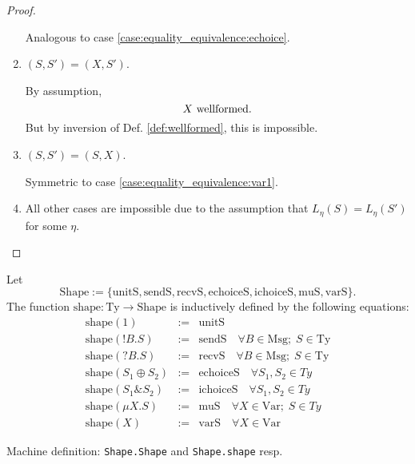 \documentclass{llncs}
\newcommand*{\Msg}{\mathrm{Msg}}
\newcommand*{\Var}{\mathrm{Var}}
\newcommand*{\Ty}{\mathrm{Ty}}
\newcommand*{\Shape}{\mathrm{Shape}}
\newcommand*{\shape}{\mathrm{shape}}
\newcommand*{\unitS}{\mathrm{unitS}}
\newcommand*{\sendS}{\mathrm{sendS}}
\newcommand*{\recvS}{\mathrm{recvS}}
\newcommand*{\echoiceS}{\mathrm{echoiceS}}
\newcommand*{\ichoiceS}{\mathrm{ichoiceS}}
\newcommand*{\muS}{\mathrm{muS}}
\newcommand*{\varS}{\mathrm{varS}}
\newcommand*{\send}{\mathord{!}}
\newcommand*{\recv}{\mathord{?}}
\newcommand*{\echoice}{\oplus}
\newcommand*{\ichoice}{\mathop{\&}}
\newcommand*{\wf}[1]{\text{$#1$ {\normalfont \rmfamily wellformed}}}
\renewcommand*{\|}{\;|\;}
\newcommand*{\machdef}[1]{Machine definition: #1}
\newcommand*{\code}[1]{\texttt{#1}}
\begin{document}
\begin{proof}
\begin{enumerate}
      Analogous to case \ref{case:equality_equivalence:echoice}.

    \item
      \label{case:equality_equivalence:var1}
      $(S, S') = (X, S')$.

      By assumption,
      \begin{equation*}
        \wf{X}.
      \end{equation*}
      But by inversion of Def. \ref{def:wellformed}, this is impossible.

    \item
      \label{case:equality_equivalence:var2}
      $(S, S') = (S, X)$.

      Symmetric to case \ref{case:equality_equivalence:var1}.

    \item
      \label{case:equality_equivalence:other}
      All other cases are impossible due to the assumption that
      $L_\eta(S) = L_\eta(S')$ for some $\eta$.
  \end{enumerate}
\end{proof}


\begin{definition}
  \label{def:shape}
  Let
  \begin{equation*}
    \Shape := \{\unitS, \sendS, \recvS, \echoiceS, \ichoiceS, \muS, \varS \}.
  \end{equation*}
  The function $\shape\colon \Ty \to \Shape$ is inductively defined by the
  following equations:
  \begin{eqnarray*}
    \shape(1) &:=& \unitS \\
    \shape(\send B.S) &:=& \sendS \quad \forall B \in \Msg;\; S \in \Ty \\
    \shape(\recv B.S) &:=& \recvS \quad \forall B \in \Msg;\; S \in \Ty \\
    \shape(S_1 \echoice S_2) &:=& \echoiceS \quad \forall S_1, S_2 \in Ty \\
    \shape(S_1 \ichoice S_2) &:=& \ichoiceS \quad \forall S_1, S_2 \in Ty \\
    \shape(\mu X.S) &:=& \muS \quad \forall X \in \Var;\; S \in Ty \\
    \shape(X) &:=& \varS \quad \forall X \in \Var
  \end{eqnarray*}

  \machdef{\code{Shape.Shape} and \code{Shape.shape} resp.}
\end{definition}
\end{document}
